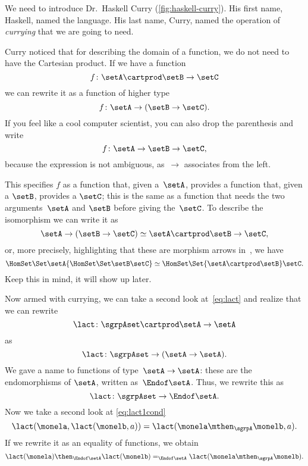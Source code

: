We need to introduce Dr.~Haskell Curry (\cref{fig:haskell-curry}).
His first name,  Haskell, named the language.
His last name, Curry, named the operation of \emph{currying} that we are going to need.

Curry noticed that for describing the domain of a function, we do not need to have the Cartesian product.
If we have a function
\begin{equation}
f \colon \setA \cartprod \setB \to \setC
\end{equation}
we can rewrite it as a function of higher type
\begin{equation}
f \colon \setA \to ( \setB \to \setC).
\end{equation}
If you feel like a cool computer scientist, you can also drop the parenthesis and write
\begin{equation}
f \colon \setA \to \setB \to \setC,
\end{equation}
because the expression is not ambiguous, as~$\to$ associates from the left.



This specifies $f$ as a function that, given a~$\setA$, provides a function that, given a $\setB$,
provides a $\setC$; this is the same as a function that needs the two arguments~$\setA$ and $\setB$ before giving the~$\setC$.  To describe the isomorphism we can write it as
\begin{equation}
  \setA \to ( \setB \to \setC) \simeq  \setA \cartprod \setB \to \setC,
\end{equation}
or, more precisely, highlighting that these are morphism arrows in~\Set, we have
\begin{equation}
  \HomSet\Set\setA{\HomSet\Set\setB\setC} \simeq \HomSet\Set{\setA \cartprod \setB}\setC.
\end{equation}
Keep this in mind, it will show up later.

Now armed with currying, we can take a second look at~\cref{eq:lact} and realize that we can rewrite
\begin{equation}
\lact \colon \sgrpAset \cartprod \setA \to \setA
\end{equation}
as
\begin{equation}
  \lact \colon \sgrpAset \to (\setA \to \setA).
\end{equation}
We gave a name to functions of type~$\setA \to \setA$: these are the endomorphisms of $\setA$, written as~$\Endof\setA$.
Thus, we rewrite this as
\begin{equation}\label{eq:act-to-endo}
  \lact \colon \sgrpAset \to \Endof\setA.
\end{equation}
Now we take a second look at \cref{eq:lact1cond}
\begin{equation}
  \lact(\monela, \lact(\monelb, a)) = \lact(\monela \mthen_\sgrpA \monelb, a).
\end{equation}
If we rewrite it as an equality of functions, we obtain
\begin{equation} \label{eq:act-to-endo-properties}
  \lact(\monela) \then_{\Endof\setA}  \lact(\monelb) =_{\Endof\setA} \lact(\monela \mthen_\sgrpA \monelb).
\end{equation}

